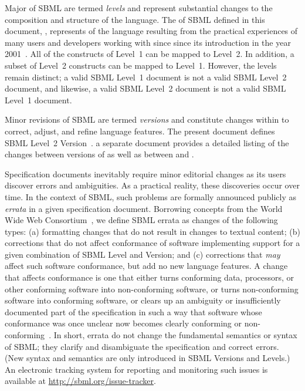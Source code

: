Major  of SBML are termed \emph{levels} and represent
substantial changes to the composition and structure of the
language.  The  of SBML defined in this document, \sbmltwo,
represents  of the language resulting from
the practical experiences of many users and developers working
with \sbmlone since since its introduction in the year
2001~\citep{hucka:2001,hucka:2003}.  All of the constructs of
Level~1 can be mapped to Level~2.  In addition, a subset of 
Level~2 constructs can be mapped to Level~1.  However, the
levels remain distinct; a valid SBML Level~1 document is not a
valid SBML Level~2 document, and likewise, a valid SBML Level~2
document is not a valid SBML Level~1 document.

Minor revisions of SBML are termed \emph{versions} and constitute
changes within  to correct, adjust, and refine
language features.  The present document defines SBML Level~2
Version~.   a separate document provides a detailed
listing of the changes between versions of \sbmltwo as well as
between \changed{\sbmltwothree} and \sbmlonetwo.

Specification documents inevitably require minor editorial changes
as its users discover errors and ambiguities.  As a practical
reality, these discoveries occur over time.  In the context of
SBML, such problems are formally announced publicly as
\emph{errata} in a given specification document.  Borrowing
concepts from the World Wide Web Consortium~\citep{jacobs:2004},
we define SBML errata as changes of the following types: (a)
formatting changes that do not result in changes to textual
content; (b) corrections that do not affect conformance of
software implementing support for a given combination of SBML
Level and Version; and (c) corrections that \emph{may} affect such
software conformance, but add no new language features.  A change
that affects conformance is one that either turns conforming data,
processors, or other conforming software into non-conforming
software, or turns non-conforming software into conforming
software, or clears up an ambiguity or insufficiently documented
part of the specification in such a way that software whose
conformance was once unclear now becomes clearly conforming or
non-conforming~\citep{jacobs:2004}.  In short, errata do not
change the fundamental semantics or syntax of SBML; they clarify
and disambiguate the specification and correct errors.  (New
syntax and semantics are only introduced in SBML Versions and
Levels.)  An electronic tracking system for reporting and
monitoring such issues is available at
\url{http://sbml.org/issue-tracker}.


